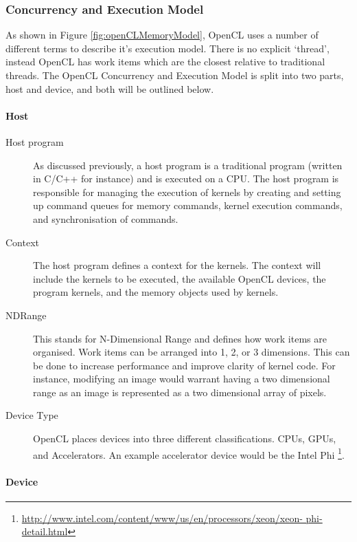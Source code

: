 \subsubsection{Concurrency and Execution Model}

As shown in Figure \ref{fig:openCLMemoryModel}, OpenCL uses a number of
different terms to describe it's execution model. There is no explicit `thread',
instead OpenCL has work items which are the closest relative to traditional
threads. The OpenCL Concurrency and Execution Model is split into two parts,
host and device, and both will be outlined below.

\paragraph{Host}

\begin{description}

\item[Host program] As discussed previously, a host program is a traditional
program (written in C/C++ for instance) and is executed on a CPU. The host
program is responsible for managing the execution of kernels by creating and
setting up command queues for memory commands, kernel execution commands, and
synchronisation of commands.

\item[Context] The host program defines a context for the kernels. The context
will include the kernels to be executed, the available OpenCL devices, the
program kernels, and the memory objects used by kernels.

\item[NDRange] This stands for N-Dimensional Range and defines how work items
are organised. Work items can be arranged into 1, 2, or 3 dimensions. This can
be done to increase performance and improve clarity of kernel code. For
instance, modifying an image would warrant having a two dimensional range as an
image is represented as a two dimensional array of pixels.

\item[Device Type] OpenCL places devices into three different classifications.
CPUs, GPUs, and Accelerators. An example accelerator device would be the Intel
Phi \footnote{\url{http://www.intel.com/content/www/us/en/processors/xeon/xeon-
phi-detail.html}}.

\end{description}

\paragraph{Device}

